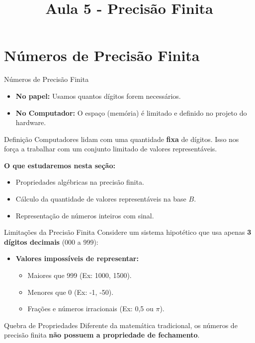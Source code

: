 \section{Números de Precisão Finita}
\title{Aula 5 - Precisão Finita}



\begin{frame}
    \titlepage
\end{frame}


\begin{frame}{Números de Precisão Finita}
    \begin{itemize}
        \item \textbf{No papel:} Usamos quantos dígitos forem necessários.
        \item \textbf{No Computador:} O espaço (memória) é limitado e definido no projeto do hardware.
    \end{itemize}

    \begin{block}{Definição}
        Computadores lidam com uma quantidade \textbf{fixa} de dígitos. Isso nos força a trabalhar com um conjunto limitado de valores representáveis.
    \end{block}

    \vspace{0.3cm}
    \textbf{O que estudaremos nesta seção:}
    \begin{itemize}
        \item Propriedades algébricas na precisão finita.
        \item Cálculo da quantidade de valores representáveis na base $B$.
        \item Representação de números inteiros com sinal.
    \end{itemize}
\end{frame}

\begin{frame}{Limitações da Precisão Finita}
    Considere um sistema hipotético que usa apenas \textbf{3 dígitos decimais} (000 a 999):

    \begin{itemize}
        \item \textbf{Valores impossíveis de representar:}
              \begin{itemize}
                  \item Maiores que 999 (Ex: 1000, 1500).
                  \item Menores que 0 (Ex: -1, -50).
                  \item Frações e números irracionais (Ex: 0,5 ou $\pi$).
              \end{itemize}
    \end{itemize}

    \begin{alertblock}{Quebra de Propriedades}
        Diferente da matemática tradicional, os números de precisão finita \textbf{não possuem a propriedade de fechamento}.
    \end{alertblock}
\end{frame}

